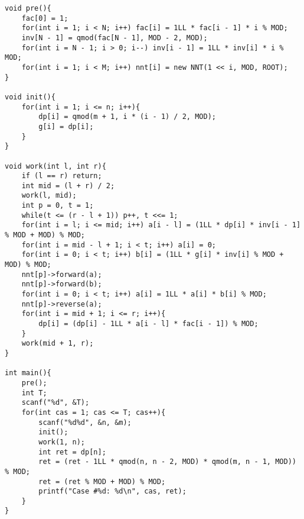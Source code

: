 \begin{verbatim}
void pre(){
    fac[0] = 1;
    for(int i = 1; i < N; i++) fac[i] = 1LL * fac[i - 1] * i % MOD;
    inv[N - 1] = qmod(fac[N - 1], MOD - 2, MOD);
    for(int i = N - 1; i > 0; i--) inv[i - 1] = 1LL * inv[i] * i % MOD;
    for(int i = 1; i < M; i++) nnt[i] = new NNT(1 << i, MOD, ROOT);
}

void init(){
    for(int i = 1; i <= n; i++){
        dp[i] = qmod(m + 1, i * (i - 1) / 2, MOD);
        g[i] = dp[i];
    }
}

void work(int l, int r){
    if (l == r) return;
    int mid = (l + r) / 2;
    work(l, mid);
    int p = 0, t = 1;
    while(t <= (r - l + 1)) p++, t <<= 1;
    for(int i = l; i <= mid; i++) a[i - l] = (1LL * dp[i] * inv[i - 1] % MOD + MOD) % MOD;
    for(int i = mid - l + 1; i < t; i++) a[i] = 0;
    for(int i = 0; i < t; i++) b[i] = (1LL * g[i] * inv[i] % MOD + MOD) % MOD;
    nnt[p]->forward(a);
    nnt[p]->forward(b);
    for(int i = 0; i < t; i++) a[i] = 1LL * a[i] * b[i] % MOD;
    nnt[p]->reverse(a);
    for(int i = mid + 1; i <= r; i++){
        dp[i] = (dp[i] - 1LL * a[i - l] * fac[i - 1]) % MOD;
    }
    work(mid + 1, r);
}

int main(){
    pre();
    int T;
    scanf("%d", &T);
    for(int cas = 1; cas <= T; cas++){
        scanf("%d%d", &n, &m);
        init();
        work(1, n);
        int ret = dp[n];
        ret = (ret - 1LL * qmod(n, n - 2, MOD) * qmod(m, n - 1, MOD)) % MOD;
        ret = (ret % MOD + MOD) % MOD;
        printf("Case #%d: %d\n", cas, ret);
    }
}
\end{verbatim}
